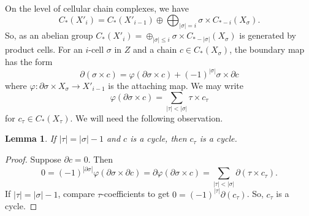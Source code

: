 \documentclass[11pt,letterpaper]{amsart}
\newtheorem{lemma}[theorem]{Lemma}
\newtheorem*{remark}{Remark}
\begin{document}
On the level of cellular chain complexes, we have 
$$
C_*(X'_i)=C_*(X'_{i-1})\oplus\bigoplus_{|\sigma|=i}\sigma\times C_{*-i}(X_{\sigma}).
$$
So, as an abelian group $C_*(X'_i)=\oplus_{|\sigma|\leq i}\sigma\times C_{*-|\sigma|}(X_{\sigma})$ is generated by product cells. For an $i$-cell $\sigma$ in $Z$ and a chain $c\in C_*(X_{\sigma})$, the boundary map has the form 
\begin{equation}
\tag{*}
\label{leibnitzformula}
\partial(\sigma\times c)=\varphi(\partial\sigma\times c)+(-1)^{|\sigma|}\sigma\times\partial c
\end{equation}
where $\varphi:\partial\sigma\times X_{\sigma}\rightarrow X'_{i-1}$ is the attaching map. We may write  
$$
\varphi(\partial\sigma\times c)=\sum_{|\tau|<|\sigma|}\tau\times c_{\tau} 
$$
for $c_{\tau}\in C_*(X_{\tau})$. We will need the following observation.

\begin{lemma}
\label{cyclelemma}
If $|\tau|=|\sigma|-1$ and $c$ is a cycle, then $c_{\tau}$ is a cycle. 
\end{lemma}
\begin{proof}
Suppose $\partial c=0$. Then
$$
0=(-1)^{|\partial\sigma|}\varphi(\partial\sigma\times\partial c)=\partial\varphi(\partial\sigma\times c)=\sum_{|\tau|<|\sigma|}\partial(\tau\times c_{\tau}). 
$$
If $|\tau|=|\sigma|-1$, compare $\tau$-coefficients to get $0=(-1)^{|\tau|}\partial(c_{\tau})$. So, $c_{\tau}$ is a cycle.  
\end{proof}
\end{document}
